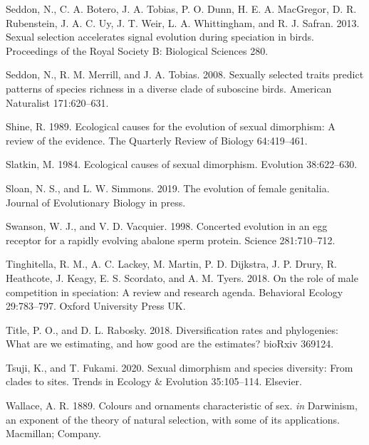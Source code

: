 \documentclass[]{article}
\begin{document}
\leavevmode\hypertarget{ref-Seddon_2013}{}%
Seddon, N., C. A. Botero, J. A. Tobias, P. O. Dunn, H. E. A. MacGregor,
D. R. Rubenstein, J. A. C. Uy, J. T. Weir, L. A. Whittingham, and R. J.
Safran. 2013. Sexual selection accelerates signal evolution during
speciation in birds. Proceedings of the Royal Society B: Biological
Sciences 280.

\leavevmode\hypertarget{ref-Seddon_2008}{}%
Seddon, N., R. M. Merrill, and J. A. Tobias. 2008. Sexually selected
traits predict patterns of species richness in a diverse clade of
suboscine birds. American Naturalist 171:620--631.

\leavevmode\hypertarget{ref-Shine_1989}{}%
Shine, R. 1989. Ecological causes for the evolution of sexual
dimorphism: A review of the evidence. The Quarterly Review of Biology
64:419--461.

\leavevmode\hypertarget{ref-Slatkin_1984}{}%
Slatkin, M. 1984. Ecological causes of sexual dimorphism. Evolution
38:622--630.

\leavevmode\hypertarget{ref-sloan2019genitalia}{}%
Sloan, N. S., and L. W. Simmons. 2019. The evolution of female
genitalia. Journal of Evolutionary Biology in press.

\leavevmode\hypertarget{ref-swanson1998abalone}{}%
Swanson, W. J., and V. D. Vacquier. 1998. Concerted evolution in an egg
receptor for a rapidly evolving abalone sperm protein. Science
281:710--712.

\leavevmode\hypertarget{ref-Tinghitella_2018}{}%
Tinghitella, R. M., A. C. Lackey, M. Martin, P. D. Dijkstra, J. P.
Drury, R. Heathcote, J. Keagy, E. S. Scordato, and A. M. Tyers. 2018. On
the role of male competition in speciation: A review and research
agenda. Behavioral Ecology 29:783--797. Oxford University Press UK.

\leavevmode\hypertarget{ref-Rabosky_diversification_2018}{}%
Title, P. O., and D. L. Rabosky. 2018. Diversification rates and
phylogenies: What are we estimating, and how good are the estimates?
bioRxiv 369124.

\leavevmode\hypertarget{ref-tsuji2020sexual}{}%
Tsuji, K., and T. Fukami. 2020. Sexual dimorphism and species diversity:
From clades to sites. Trends in Ecology \& Evolution 35:105--114.
Elsevier.

\leavevmode\hypertarget{ref-Wallace_1889}{}%
Wallace, A. R. 1889. Colours and ornaments characteristic of sex.
\emph{in} Darwinism, an exponent of the theory of natural selection,
with some of its applications. Macmillan; Company.
\end{document}
